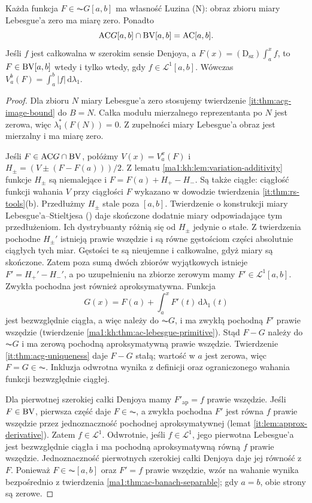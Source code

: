 \begin{wniosek}\label{it:cor:acg-bv}
Każda funkcja $F\in\AC G[a,b]$ ma własność Luzina (N): obraz zbioru miary Lebesgue'a zero ma miarę zero. Ponadto
\[
 \mathrm{AC} G[a,b]\cap\mathrm{BV}[a,b]=\mathrm{AC}[a,b].
\]
Jeśli $f$ jest całkowalna w szerokim sensie Denjoya, a $F(x)=(\mathrm D_{\mathrm{sz}})\int_a^x f$, to $F\in\mathrm{BV}[a,b]$ wtedy i tylko wtedy, gdy $f\in\mathcal L^1[a,b]$. Wówczas $V_a^b(F)=\int_a^b|f|\,\mathrm d\lambda_1$.
\end{wniosek}
\begin{proof}
Dla zbioru $N$ miary Lebesgue'a zero stosujemy twierdzenie
\ref{it:thm:acg-image-bound} do $B=N$. Całka modułu
mierzalnego reprezentanta po $N$ jest zerowa, więc
$\lambda_1^*(F(N))=0$. Z zupełności miary Lebesgue'a
obraz jest mierzalny i ma miarę zero.

Jeśli $F\in\mathrm{AC} G\cap\mathrm{BV}$, połóżmy $V(x)=V_a^x(F)$
i $H_\pm=(V\pm(F-F(a)))/2$. Z lematu
\ref{ma1:kh:lem:variation-additivity} funkcje $H_\pm$
są niemalejące i $F=F(a)+H_+-H_-$.
Są także ciągłe: ciągłość funkcji wahania $V$ przy
ciągłości $F$ wykazano w dowodzie twierdzenia
\ref{it:thm:rs-tools}(b).
Przedłużmy $H_\pm$ stale poza $[a,b]$.
Twierdzenie o konstrukcji miary Lebesgue'a--Stieltjesa
()
daje skończone dodatnie miary odpowiadające tym
przedłużeniom. Ich dystrybuanty różnią się od $H_\pm$
jedynie o stałe. Z twierdzenia
pochodne $H_\pm'$ istnieją prawie wszędzie i są równe
gęstościom części absolutnie ciągłych tych miar.
Gęstości te są nieujemne i całkowalne, gdyż miary
są skończone. Zatem poza sumą dwóch zbiorów wyjątkowych
istnieje $F'=H_+'-H_-'$, a po uzupełnieniu na zbiorze
zerowym mamy $F'\in\mathcal L^1[a,b]$. Zwykła pochodna jest również aproksymatywna. Funkcja
\[
 G(x)=F(a)+\int_a^x F'(t)\,\mathrm d\lambda_1(t)
\]
jest bezwzględnie ciągła, a więc należy do $\AC G$, i ma zwykłą pochodną $F'$ prawie wszędzie (twierdzenie \ref{ma1:kh:thm:ac-lebesgue-primitive}). Stąd $F-G$ należy do $\AC G$ i ma zerową pochodną aproksymatywną prawie wszędzie. Twierdzenie \ref{it:thm:acg-uniqueness} daje $F-G$ stałą; wartość w $a$ jest zerowa, więc $F=G\in\AC$. Inkluzja odwrotna wynika z definicji oraz ograniczonego wahania funkcji bezwzględnie ciągłej.

Dla pierwotnej szerokiej całki Denjoya mamy $F'_{\mathrm{ap}}=f$ prawie wszędzie. Jeśli $F\in\mathrm{BV}$, pierwsza część daje $F\in\AC$, a zwykła pochodna $F'$ jest równa $f$ prawie wszędzie przez jednoznaczność pochodnej aproksymatywnej (lemat \ref{it:lem:approx-derivative}). Zatem $f\in\mathcal L^1$. Odwrotnie, jeśli $f\in\mathcal L^1$, jego pierwotna Lebesgue'a jest bezwzględnie ciągła i ma pochodną aproksymatywną równą $f$ prawie wszędzie. Jednoznaczność pierwotnych szerokiej całki Denjoya daje jej równość z $F$. Ponieważ $F\in\AC[a,b]$ oraz $F'=f$ prawie wszędzie,
wzór na wahanie wynika bezpośrednio z twierdzenia
\ref{ma1:thm:ac-banach-separable}; gdy $a=b$, obie strony
są zerowe.
\end{proof}

